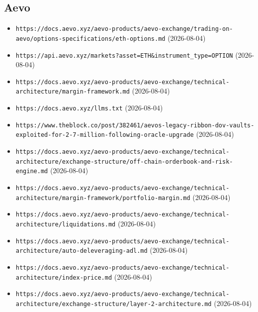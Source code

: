 \subsection*{Aevo}
\begin{itemize}\setlength{\itemsep}{0pt}\small
\item \texttt{https://docs.aevo.xyz/aevo-products/aevo-exchange/trading-on-aevo/options-specifications/eth-options.md} (2026-08-04)
\item \texttt{https://api.aevo.xyz/markets?asset=ETH\&instrument\_type=OPTION} (2026-08-04)
\item \texttt{https://docs.aevo.xyz/aevo-products/aevo-exchange/technical-architecture/margin-framework.md} (2026-08-04)
\item \texttt{https://docs.aevo.xyz/llms.txt} (2026-08-04)
\item \texttt{https://www.theblock.co/post/382461/aevos-legacy-ribbon-dov-vaults-exploited-for-2-7-million-following-oracle-upgrade} (2026-08-04)
\item \texttt{https://docs.aevo.xyz/aevo-products/aevo-exchange/technical-architecture/exchange-structure/off-chain-orderbook-and-risk-engine.md} (2026-08-04)
\item \texttt{https://docs.aevo.xyz/aevo-products/aevo-exchange/technical-architecture/margin-framework/portfolio-margin.md} (2026-08-04)
\item \texttt{https://docs.aevo.xyz/aevo-products/aevo-exchange/technical-architecture/liquidations.md} (2026-08-04)
\item \texttt{https://docs.aevo.xyz/aevo-products/aevo-exchange/technical-architecture/auto-deleveraging-adl.md} (2026-08-04)
\item \texttt{https://docs.aevo.xyz/aevo-products/aevo-exchange/technical-architecture/index-price.md} (2026-08-04)
\item \texttt{https://docs.aevo.xyz/aevo-products/aevo-exchange/technical-architecture/exchange-structure/layer-2-architecture.md} (2026-08-04)
\end{itemize}

